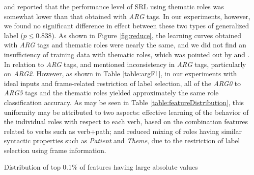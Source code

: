\documentclass[english]{jnlp_1.4_rep}
\begin{document}
 and  reported that the performance level of SRL using thematic roles was somewhat lower than that obtained with {\it ARG} tags. In our experiments, however, we found no significant difference in effect between these two types of generalized label ($p \leq 0.838$). As shown in Figure \ref{fig:reduce}, the learning curves obtained with {\it ARG} tags and thematic roles were nearly the same, and we did not find an insufficiency of training data with thematic roles, which was pointed out by  and . In relation to {\it ARG} tags,  and  mentioned inconsistency in {\it ARG} tags, particularly on {\it ARG2}. However, as shown in Table \ref{table:argF1}, in our experiments with ideal inputs and frame-related restriction of label selection, all of the {\it ARG0} to {\it ARG5} tags and the thematic roles yielded approximately the same role classification accuracy. As may be seen in Table \ref{table:featureDistribution}, this uniformity may be attributed to two aspects: effective learning of the behavior of the individual roles with respect to each verb, based on the combination features related to verbs such as verb+path; and reduced mixing of roles having similar syntactic properties such as {\it Patient} and {\it Theme}, due to the restriction of label selection using frame information.

\begin{table}[b]
\caption{Distribution of top 0.1\% of features having large absolute values}
\label{table:featureDistribution}

\end{table}


\begin{figure}[b]

\label{fig:errMap}
\end{figure}
\end{document}
